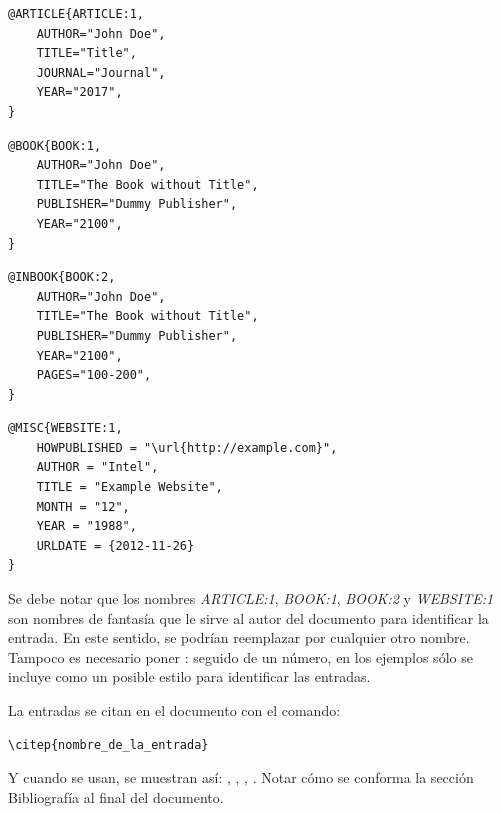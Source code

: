 \begin{lstlisting}
@ARTICLE{ARTICLE:1,
    AUTHOR="John Doe",
    TITLE="Title",
    JOURNAL="Journal",
    YEAR="2017",
}
\end{lstlisting}


\begin{lstlisting}
@BOOK{BOOK:1,
    AUTHOR="John Doe",
    TITLE="The Book without Title",
    PUBLISHER="Dummy Publisher",
    YEAR="2100",
}
\end{lstlisting}


\begin{lstlisting}
@INBOOK{BOOK:2,
    AUTHOR="John Doe",
    TITLE="The Book without Title",
    PUBLISHER="Dummy Publisher",
    YEAR="2100",
    PAGES="100-200",
}
\end{lstlisting}


\begin{lstlisting}
@MISC{WEBSITE:1,
    HOWPUBLISHED = "\url{http://example.com}",
    AUTHOR = "Intel",
    TITLE = "Example Website",
    MONTH = "12",
    YEAR = "1988",
    URLDATE = {2012-11-26}
}
\end{lstlisting}

Se debe notar que los nombres \emph{ARTICLE:1}, \emph{BOOK:1}, \emph{BOOK:2} y \emph{WEBSITE:1} son nombres de fantasía que le sirve al autor del documento para identificar la entrada. En este sentido, se podrían reemplazar por cualquier otro nombre.  Tampoco es necesario poner : seguido de un número, en los ejemplos sólo se incluye como un posible estilo para identificar las entradas.

La entradas se citan en el documento con el comando: 

\begin{verbatim}
\citep{nombre_de_la_entrada}
\end{verbatim}

Y cuando se usan, se muestran así: \citep{ARTICLE:1}, \citep{BOOK:1}, \citep{BOOK:2}, \citep{WEBSITE:1}.  Notar cómo se conforma la sección Bibliografía al final del documento. 

